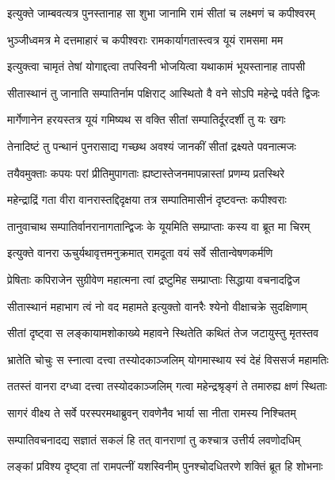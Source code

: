 \twolineshloka
{इत्युक्ते जाम्बवत्यत्र पुनस्तानाह सा शुभा}
{जानामि रामं सीतां च लक्ष्मणं च कपीश्वरम्} %

\twolineshloka
{भुञ्जीध्वमत्र मे दत्तमाहारं च कपीश्वराः}
{रामकार्यागतास्त्वत्र यूयं रामसमा मम} %

\twolineshloka
{इत्युक्त्वा चामृतं तेषां योगाद्दत्वा तपस्विनी}
{भोजयित्वा यथाकामं भूयस्तानाह तापसी} %

\twolineshloka
{सीतास्थानं तु जानाति सम्पातिर्नाम पक्षिराट्}
{आस्थितो वै वने सोऽपि महेन्द्रे पर्वते द्विजः} %

\twolineshloka
{मार्गेणानेन हरयस्तत्र यूयं गमिष्यथ}
{स वक्ति सीतां सम्पातिर्दूरदर्शी तु यः खगः} %

\twolineshloka
{तेनादिष्टं तु पन्थानं पुनरासाद्य गच्छथ}
{अवश्यं जानकीं सीतां द्रक्ष्यते पवनात्मजः} %

\twolineshloka
{तयैवमुक्ताः कपयः परां प्रीतिमुपागताः}
{ह्यष्टास्तेजनमापन्नास्तां प्रणम्य प्रतस्थिरे} %

\twolineshloka
{महेन्द्राद्रिं गता वीरा वानरास्तद्दिदृक्षया}
{तत्र सम्पातिमासीनं दृष्टवन्तः कपीश्वराः} %

\twolineshloka
{तानुवाचाथ सम्पातिर्वानरानागतान्द्विजः}
{के यूयमिति सम्प्राप्ताः कस्य वा ब्रूत मा चिरम्} %

\twolineshloka
{इत्युक्ते वानरा ऊचुर्यथावृत्तमनुक्रमात्}
{रामदूता वयं सर्वे सीतान्वेषणकर्मणि} %

\twolineshloka
{प्रेषिताः कपिराजेन सुग्रीवेण महात्मना}
{त्वां द्रष्टुमिह सम्प्राप्ताः सिद्धाया वचनादद्विज} %

\twolineshloka
{सीतास्थानं महाभाग त्वं नो वद महामते}
{इत्युक्तो वानरैः श्येनो वीक्षाचक्रे सुदक्षिणाम्} %

\twolineshloka
{सीतां दृष्ट्वा स लङ्कायामशोकाख्ये महावने}
{स्थितेति कथितं तेज जटायुस्तु मृतस्तव} %

\twolineshloka
{भ्रातेति चोचुः स स्नात्वा दत्त्वा तस्योदकाञ्जलिम्}
{योगमास्थाय स्वं देहं विससर्ज महामतिः} %

\twolineshloka
{ततस्तं वानरा दग्ध्वा दत्त्वा तस्योदकाञ्जलिम्}
{गत्वा महेन्द्रश्रृङ्गं ते तमारुह्य क्षणं स्थिताः} %

\twolineshloka
{सागरं वीक्ष्य ते सर्वे परस्परमथाब्रुवन्}
{रावणेनैव भार्या सा नीता रामस्य निश्चितम्} %

\twolineshloka
{सम्पातिवचनादद्य सज्ञातं सकलं हि तत्}
{वानराणां तु कश्चात्र उत्तीर्य लवणोदधिम्} %

\twolineshloka
{लङ्कां प्रविश्य दृष्ट्वा तां रामपत्नीं यशस्विनीम्}
{पुनश्चोदधितरणे शक्तिं ब्रूत हि शोभनाः} %

